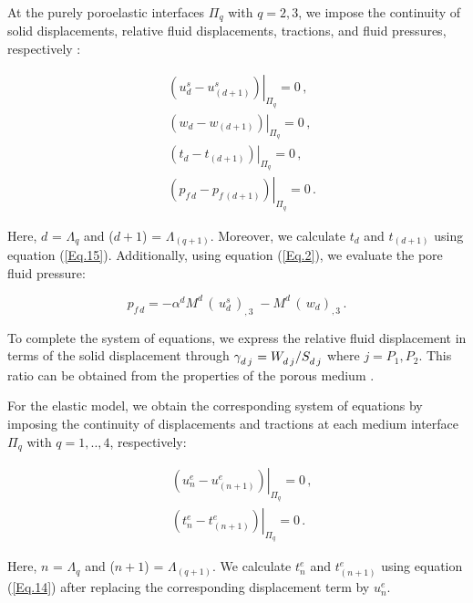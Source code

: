 \documentclass[draft]{agujournal2019}
\begin{document}
At the purely poroelastic interfaces $\Pi_q$ with $q=2,3$, we impose the continuity of solid displacements, relative fluid displacements, tractions, and fluid pressures, respectively \cite{Deresiewicz1963}:
\begin{linenomath*}
\begin{equation}\label{Eq.16}
\begin{split}
&  \left. \left( u_d^s -  u_{(d+1)}^s \right) \right \rvert_{\Pi_q} = 0 \,, \\
&  \left. \left(  w_d -  w_{(d+1)} \right) \right \rvert_{\Pi_q} = 0 \,, \\
& \left . \left(  t_d  - t_{(d+1)}  \right) \right \rvert_{\Pi_q}= 0 \,,\\
&  \left. \left(  p_{f\,d} -  p_{f\, (d+1)} \right) \right \rvert_{\Pi_q} = 0 \,.
\end{split}
\end{equation}
\end{linenomath*}
Here, $d$ = $\Lambda_q$ and ($d+1$) = $\Lambda_{(q+1)}$. Moreover, we calculate $t_d$ and $t_{(d+1)}$ using equation (\ref{Eq.15}). 
Additionally, using equation (\ref{Eq.2}), we evaluate the pore fluid pressure:
\begin{linenomath*}
\begin{equation}\label{Eq.17}
p_{f \, d} = - \alpha^d M^d\,  \left( \, u_d^{s} \, \right)_{,3}\; - M^d \,  \left( \, w_d \right)_{,3} \, .
\end{equation}
\end{linenomath*}
To complete the system of equations, we express the relative fluid displacement in terms of the solid displacement through
 $\tensor []{\gamma}{_d_{\,j}}=\tensor*[]{W}{_d_{\, j}}/\tensor*[]{S}{_d_{\, j}}$ where $j=P_1, P_2$. This ratio can be  obtained from the properties of the porous medium \cite{Barbosa2016}.
 
For the elastic model, we obtain the corresponding system of equations by imposing the continuity of displacements and tractions  at each medium interface $\Pi_q$ with $q=1,..,4$, respectively:
\begin{linenomath*}
\begin{equation}\label{Eq.18}
\begin{split}
&  \left. \left(  u_n^e -  u_{(n+1)}^e \right) \right \rvert_{\Pi_q} = 0 \,, \\
&  \left. \left( t_n^e  - t_{(n+1)}^e  \right) \right \rvert_{\Pi_q} = 0 \,.
\end{split}
\end{equation}
\end{linenomath*}
Here, $n$ = $\Lambda_q$ and ($n+1$) = $\Lambda_{(q+1)}$. We calculate $t_n^e$  and $t_{(n+1)}^e$ using equation (\ref{Eq.14}) after replacing the corresponding displacement term by $u_n^e$.
\end{document}

